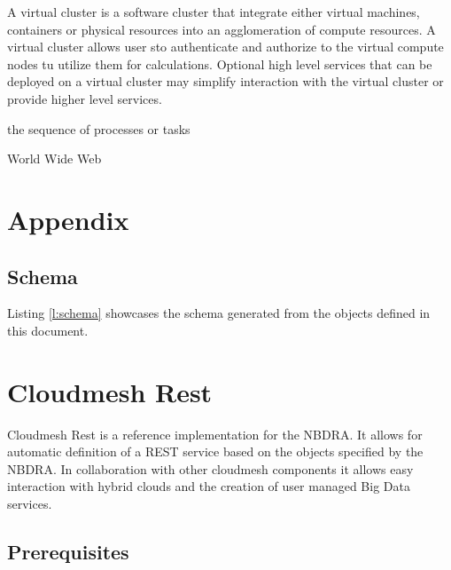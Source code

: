 \documentclass[10pt]{article}
\begin{document}
\begin{description}[leftmargin=8em,style=nextline]
\item[Virtual Cluster] A virtual cluster is a software cluster that
  integrate either virtual machines, containers or physical resources into an
  agglomeration of compute resources. A virtual cluster allows user
  sto authenticate and authorize to the virtual compute nodes tu
  utilize them for calculations. Optional high level services that can
  be deployed on a virtual cluster may simplify
  interaction with the virtual cluster or provide higher level
  services. 

\item[Workflow] the sequence of processes or tasks

\item[WWW] World Wide Web

\end{description}
 

\newpage


\newpage

\appendix

\section{Appendix}

\subsection{Schema}\label{s:schema}

Listing \ref{l:schema} showcases the schema generated from the objects
defined in this document.


\section{Cloudmesh Rest}\label{s:cloudmesh-rest}

Cloudmesh Rest is a reference implementation for the NBDRA. It
allows for automatic definition of a REST service based on the objects
specified by the NBDRA. In collaboration with other cloudmesh
components it allows easy interaction with hybrid clouds and the
creation of user managed Big Data services. 

\subsection{Prerequisites}\label{prerequistis}
\end{document}
